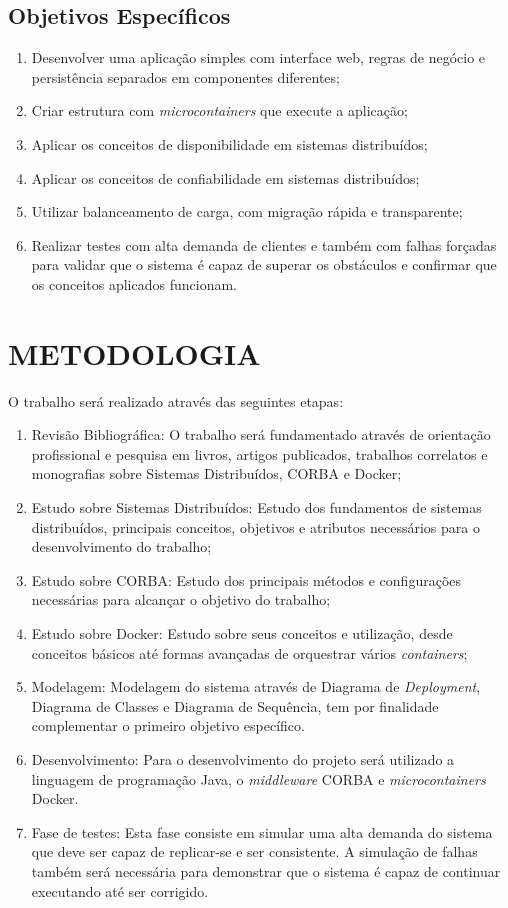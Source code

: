 \subsection{Objetivos Específicos} 
\begin{enumerate}[label=\alph*]
	\item Desenvolver uma aplicação simples com interface web, regras de negócio e persistência separados em componentes diferentes;
	\item Criar estrutura com \textit{microcontainers} que execute a aplicação;
	\item Aplicar os conceitos de disponibilidade em sistemas distribuídos;
	\item Aplicar os conceitos de confiabilidade em sistemas distribuídos;
	\item Utilizar balanceamento de carga, com migração rápida e transparente;
	\item Realizar testes com alta demanda de clientes e também com falhas forçadas para validar que o sistema é capaz de superar os obstáculos e confirmar que os conceitos aplicados funcionam.
\end{enumerate}

\section{METODOLOGIA}
	O trabalho será realizado através das seguintes etapas:

\begin{enumerate}
	\item Revisão Bibliográfica: O trabalho será fundamentado através de orientação profissional e pesquisa em livros, artigos publicados, trabalhos correlatos e monografias sobre Sistemas Distribuídos, CORBA e Docker;
	\item Estudo sobre Sistemas Distribuídos: Estudo dos fundamentos de sistemas distribuídos, principais conceitos, objetivos e atributos necessários para o desenvolvimento do trabalho;
	\item Estudo sobre CORBA: Estudo dos principais métodos e configurações necessárias para alcançar o objetivo do trabalho;
	\item Estudo sobre Docker: Estudo sobre seus conceitos e utilização, desde conceitos básicos até formas avançadas de orquestrar vários \textit{containers};
	\item Modelagem: Modelagem do sistema através de Diagrama de \textit{Deployment}, Diagrama de Classes e Diagrama de Sequência, tem por finalidade complementar o primeiro objetivo específico.
	\item Desenvolvimento: Para o desenvolvimento do projeto será utilizado a linguagem de programação Java, o \textit{middleware} CORBA e \textit{microcontainers} Docker.
	\item Fase de testes: Esta fase consiste em simular uma alta demanda do sistema que deve ser capaz de replicar-se e ser consistente. A simulação de falhas também será necessária para demonstrar que o sistema é capaz de continuar executando até ser corrigido.
\end{enumerate}